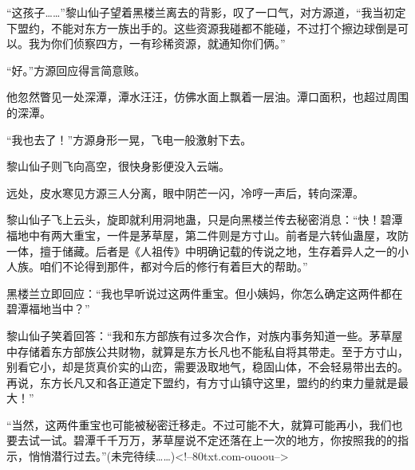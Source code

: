 \begin{this_body}
“这孩子……”黎山仙子望着黑楼兰离去的背影，叹了一口气，对方源道，“我当初定下盟约，不能对东方一族出手的。这些资源我碰都不能碰，不过打个擦边球倒是可以。我为你们侦察四方，一有珍稀资源，就通知你们俩。”

“好。”方源回应得言简意赅。

他忽然瞥见一处深潭，潭水汪汪，仿佛水面上飘着一层油。潭口面积，也超过周围的深潭。

“我也去了！”方源身形一晃，飞电一般激射下去。

黎山仙子则飞向高空，很快身影便没入云端。

远处，皮水寒见方源三人分离，眼中阴芒一闪，冷哼一声后，转向深潭。

黎山仙子飞上云头，旋即就利用洞地蛊，只是向黑楼兰传去秘密消息：“快！碧潭福地中有两大重宝，一件是茅草屋，第二件则是方寸山。前者是六转仙蛊屋，攻防一体，擅于储藏。后者是《人祖传》中明确记载的传说之地，生存着异人之一的小人族。咱们不论得到那件，都对今后的修行有着巨大的帮助。”

黑楼兰立即回应：“我也早听说过这两件重宝。但小姨妈，你怎么确定这两件都在碧潭福地当中？”

黎山仙子笑着回答：“我和东方部族有过多次合作，对族内事务知道一些。茅草屋中存储着东方部族公共财物，就算是东方长凡也不能私自将其带走。至于方寸山，别看它小，却是货真价实的山峦，需要汲取地气，稳固山体，不会轻易带出去的。再说，东方长凡又和各正道定下盟约，有方寸山镇守这里，盟约的约束力量就是最大！”

“当然，这两件重宝也可能被秘密迁移走。不过可能不大，就算可能再小，我们也要去试一试。碧潭千千万万，茅草屋说不定还落在上一次的地方，你按照我的的指示，悄悄潜行过去。”(未完待续……)<!--80txt.com-ouoou-->

\end{this_body}


